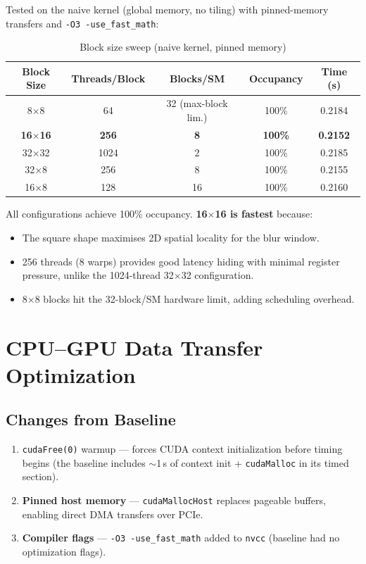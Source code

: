 \documentclass[11pt]{article}
\begin{document}
Tested on the naive kernel (global memory, no tiling) with pinned-memory transfers
and \texttt{-O3 -use\_fast\_math}:

\begin{table}[h]
\centering
\caption{Block size sweep (naive kernel, pinned memory)}
\smallskip
\begin{tabular}{c c c c c}
\toprule
\textbf{Block Size} & \textbf{Threads/Block} & \textbf{Blocks/SM} & \textbf{Occupancy} & \textbf{Time (s)} \\
\midrule
8$\times$8   & 64   & 32 (max-block lim.) & 100\% & 0.2184 \\
\rowcolor{green!15}
\textbf{16$\times$16} & \textbf{256} & \textbf{8} & \textbf{100\%} & \textbf{0.2152} \\
32$\times$32 & 1024 & 2                   & 100\% & 0.2185 \\
32$\times$8  & 256  & 8                   & 100\% & 0.2155 \\
16$\times$8  & 128  & 16                  & 100\% & 0.2160 \\
\bottomrule
\end{tabular}
\end{table}

All configurations achieve 100\% occupancy. \textbf{16$\times$16 is fastest} because:
\begin{itemize}[]
  \item The square shape maximises 2D spatial locality for the blur window.
  \item 256 threads (8 warps) provides good latency hiding with minimal register
        pressure, unlike the 1024-thread 32$\times$32 configuration.
  \item 8$\times$8 blocks hit the 32-block/SM hardware limit, adding scheduling overhead.
\end{itemize}

\section{CPU--GPU Data Transfer Optimization}

\subsection{Changes from Baseline}
\begin{enumerate}[]
  \item \texttt{cudaFree(0)} warmup --- forces CUDA context initialization before
        timing begins (the baseline includes ${\sim}$1\,s of context init +
        \texttt{cudaMalloc} in its timed section).
  \item \textbf{Pinned host memory} --- \texttt{cudaMallocHost} replaces pageable
        buffers, enabling direct DMA transfers over PCIe.
  \item \textbf{Compiler flags} --- \texttt{-O3 -use\_fast\_math} added to \texttt{nvcc}
        (baseline had no optimization flags).
\end{enumerate}
\end{document}

